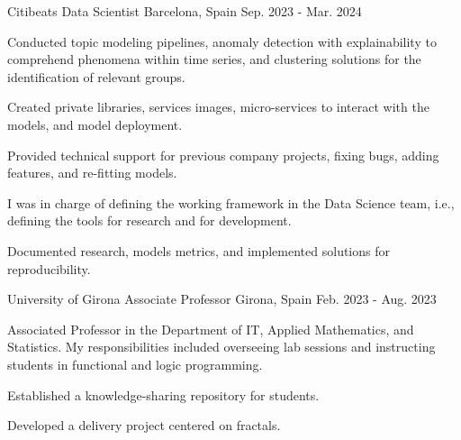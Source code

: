 

\begin{cventries}


  \cventry
  {Citibeats} %
  {Data Scientist} %
  {Barcelona, Spain} %
  {Sep. 2023 - Mar. 2024} %
  {
  \begin{cvitems}
    \item {Conducted topic modeling pipelines, anomaly detection with
      explainability to comprehend phenomena within time series, and clustering
    solutions for the identification of relevant groups.}
    \item {Created private libraries, services images, micro-services to
      interact with the models, and model deployment.}
    \item {Provided technical support for previous company projects, fixing
      bugs, adding features, and re-fitting models.}
    \item {I was in charge of defining the working framework in the Data
      Science team, i.e., defining the tools for research and for development.}
    \item {Documented research, models metrics, and implemented solutions for
      reproducibility.}
  \end{cvitems}
}


  \cventry
  {University of Girona} %
  {Associate Professor} %
  {Girona, Spain} %
  {Feb. 2023 - Aug. 2023} %
  {
    \begin{cvitems} %
    \item {Associated Professor in the Department of IT,
      Applied Mathematics, and Statistics.
      My responsibilities included overseeing lab sessions and instructing students in functional and logic programming.}
    \item{Established a knowledge-sharing repository for students.}
    \item{Developed a delivery project centered on fractals.}
    \end{cvitems}
    }



\end{cventries}
